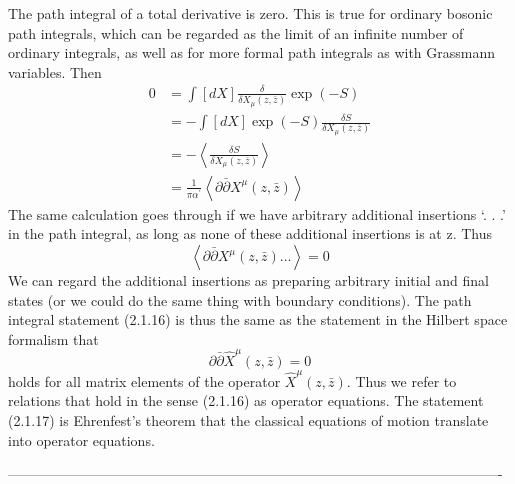 The path integral of a total derivative is zero. This is true for ordinary bosonic path integrals, which can be regarded as the limit of an infinite number of ordinary integrals, as well as for more formal path integrals as
with Grassmann variables. Then
\begin{equation}
\begin{aligned}
0 &=\int[d X] \frac{\delta}{\delta X_{\mu}(z, \bar{z})} \exp (-S) \\
&=-\int[d X] \exp (-S) \frac{\delta S}{\delta X_{\mu}(z, \bar{z})} \\
&=-\left\langle\frac{\delta S}{\delta X_{\mu}(z, \bar{z})}\right\rangle \\
&=\frac{1}{\pi \alpha^{\prime}}\left\langle\partial \bar{\partial} X^{\mu}(z, \bar{z})\right\rangle
\end{aligned}
\end{equation}
The same calculation goes through if we have arbitrary additional insertions ‘. . .’ in the path integral, as long as none of these additional insertions
is at z. Thus
\begin{equation}
\left\langle\partial \bar{\partial} X^{\mu}(z, \bar{z}) \ldots\right\rangle=0
\end{equation}
We can regard the additional insertions as preparing arbitrary initial and
final states (or we could do the same thing with boundary conditions).
The path integral statement (2.1.16) is thus the same as the statement in
the Hilbert space formalism that
\begin{equation}
\partial \bar{\partial} \hat{X}^{\mu}(z, \bar{z})=0
\end{equation}
holds for all matrix elements of the operator $\hat{X}^{\mu}(z, \bar{z}) .$ Thus we refer to relations that hold in the sense (2.1.16) as operator equations. The statement (2.1.17) is Ehrenfest's theorem that the classical equations of motion translate into operator equations.

----------------------------------------------------------------------------------------------------------

